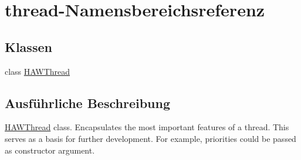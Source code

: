 \hypertarget{namespacethread}{}\section{thread-\/\+Namensbereichsreferenz}
\label{namespacethread}
\subsection*{Klassen}
\begin{DoxyCompactItemize}
\item 
class \hyperlink{classthread_1_1_h_a_w_thread}{H\+A\+W\+Thread}
\end{DoxyCompactItemize}


\subsection{Ausführliche Beschreibung}
\hyperlink{classthread_1_1_h_a_w_thread}{H\+A\+W\+Thread} class. Encapsulates the most important features of a thread. This serves as a basis for further development. For example, priorities could be passed as constructor argument. 